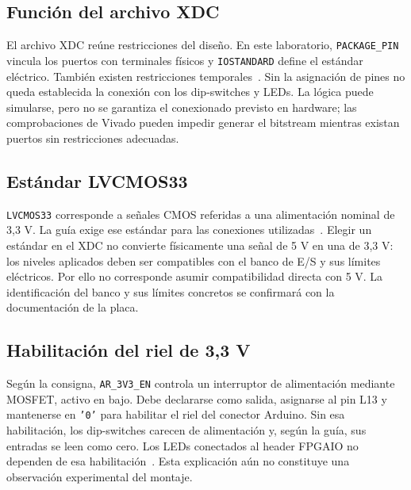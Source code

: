 \documentclass[conference]{IEEEtran}
\begin{document}
\subsection{Función del archivo XDC}
El archivo XDC reúne restricciones del diseño. En este laboratorio,
\texttt{PACKAGE\_PIN} vincula los puertos con terminales físicos y
\texttt{IOSTANDARD} define el estándar eléctrico. También existen
restricciones temporales~\cite{xdc}. Sin la asignación de pines no
queda establecida la conexión con los dip-switches y LEDs. La lógica
puede simularse, pero no se garantiza el conexionado previsto en
hardware; las comprobaciones de Vivado pueden impedir generar el
bitstream mientras existan puertos sin restricciones adecuadas.

\subsection{Estándar LVCMOS33}
\texttt{LVCMOS33} corresponde a señales CMOS referidas a una
alimentación nominal de 3,3 V. La guía exige ese estándar para las
conexiones utilizadas~\cite{guia}. Elegir un estándar en el XDC no
convierte físicamente una señal de 5 V en una de 3,3 V: los niveles
aplicados deben ser compatibles con el banco de E/S y sus límites
eléctricos. Por ello no corresponde asumir compatibilidad directa
con 5 V. La identificación del banco y sus límites concretos se
confirmará con la documentación de la placa.

\subsection{Habilitación del riel de 3,3 V}
Según la consigna, \texttt{AR\_3V3\_EN} controla un interruptor de
alimentación mediante MOSFET, activo en bajo. Debe declararse como
salida, asignarse al pin L13 y mantenerse en \texttt{'0'} para
habilitar el riel del conector Arduino. Sin esa habilitación, los
dip-switches carecen de alimentación y, según la guía, sus entradas
se leen como cero. Los LEDs conectados al header FPGAIO no dependen
de esa habilitación~\cite{guia}. Esta explicación aún no constituye
una observación experimental del montaje.
\end{document}
